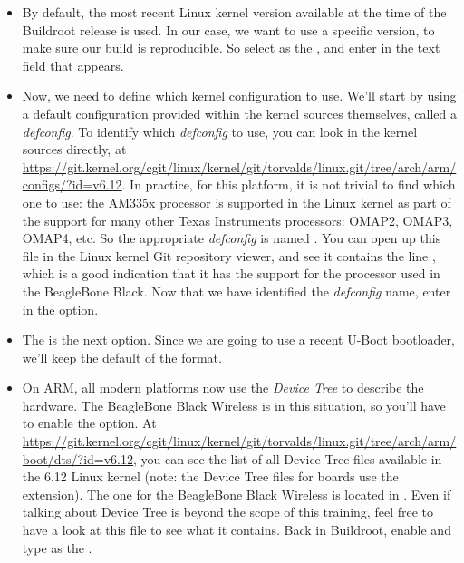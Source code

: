 \begin{itemize}
\begin{itemize}
  \item By default, the most recent Linux kernel version available at
    the time of the Buildroot release is used. In our case, we want to
    use a specific version, to make sure our build is reproducible. So
    select  as the , and
    enter  in the  text field that
    appears.

  \item Now, we need to define which kernel configuration to
    use. We'll start by using a default configuration provided within
    the kernel sources themselves, called a {\em defconfig}. To
    identify which {\em defconfig} to use, you can look in the kernel
    sources directly, at
    \url{https://git.kernel.org/cgit/linux/kernel/git/torvalds/linux.git/tree/arch/arm/configs/?id=v6.12}. In
    practice, for this platform, it is not trivial to find which one
    to use: the AM335x processor is supported in the Linux kernel as
    part of the support for many other Texas Instruments processors:
    OMAP2, OMAP3, OMAP4, etc. So the appropriate {\em defconfig} is
    named . You can open up this file in the
    Linux kernel Git repository viewer, and see it contains the line
    , which is a good indication that it has
    the support for the processor used in the BeagleBone Black. Now
    that we have identified the {\em defconfig} name, enter
     in the  option.

  \item The  is the next option. Since we
    are going to use a recent U-Boot bootloader, we'll keep the
    default of the  format.

  \item On ARM, all modern platforms now use the {\em Device Tree} to
    describe the hardware. The BeagleBone Black Wireless is in this
    situation, so you'll have to enable the 
    option. At \url{https://git.kernel.org/cgit/linux/kernel/git/torvalds/linux.git/tree/arch/arm/boot/dts/?id=v6.12},
    you can see the list of all Device Tree files available in the 6.12
    Linux kernel (note: the Device Tree files for boards use
    the  extension). The one for the BeagleBone Black
    Wireless is  located
    in . Even if talking about Device Tree is beyond
    the scope of this training, feel free to have a look at this file
    to see what it contains. Back in Buildroot, enable  and
    type  as the .


\end{itemize}
\end{itemize}
